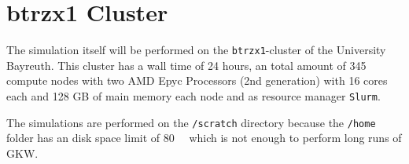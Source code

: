 \section{btrzx1 Cluster}
\label{sec:cluster}

The simulation itself will be performed on the \texttt{btrzx1}-cluster of the University Bayreuth. This cluster has a wall time of 24 hours, an total amount of 345 compute nodes with
two AMD Epyc Processors (2nd generation) with 16 cores each and 128 GB of main memory each node and as resource manager \texttt{Slurm}. \cite{btrzx1}

The simulations are performed on the \texttt{/scratch} directory because the \texttt{/home} folder has an disk space limit of \SI{80}{\giga\byte} which is not enough to perform long runs of GKW.
